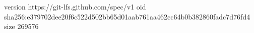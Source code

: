 version https://git-lfs.github.com/spec/v1
oid sha256:e379702dee20f6c522d502bb65d01aab761aa462cc64b0b382860fadc7d76fd4
size 269576
